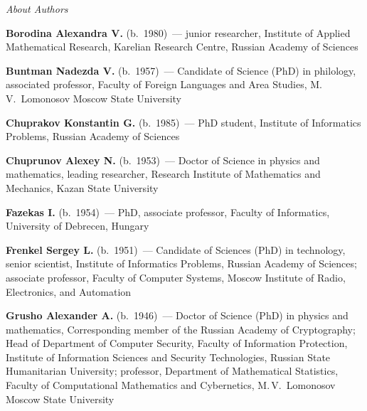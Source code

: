 \begin{center}\LARGE
\textit{About Authors}
\end{center}
\thispagestyle{empty}

\vspace*{48pt}

\begin{multicols}{2}



\noindent
\textbf{Borodina Alexandra V.} (b.\ 1980)~--- junior researcher,
Institute of Applied Mathematical Research, Karelian Research Centre, Russian Academy of Sciences

\vspace*{3pt}

\noindent
\textbf{Buntman Nadezda V.} (b.\ 1957)~--- Candidate of Science (PhD) in philology, 
associated professor, Faculty of Foreign Languages and Area Studies, M.\,V.~Lomonosov Moscow State University

\vspace*{3pt}

\noindent
\textbf{Chuprakov Konstantin G.} (b.\ 1985)~--- PhD student, Institute of Informatics Problems,  
Russian Academy of Sciences

\vspace*{3pt}

\noindent
\textbf{Chuprunov Alexey N.} (b.\ 1953)~--- Doctor of Science in physics and mathematics,
leading researcher, Research Institute of Mathematics and Mechanics, Kazan State University

\vspace*{3pt}

\noindent
\textbf{Fazekas I.} (b.\ 1954)~--- PhD, associate professor, Faculty of Informatics, University of Debrecen, Hungary

\vspace*{3pt}

\noindent
\textbf{Frenkel Sergey L.} (b.\ 1951)~--- Candidate of Sciences (PhD) in technology, senior scientist, 
Institute of Informatics Problems, Russian Academy of Sciences; associate professor, Faculty of Computer Systems, 
Moscow Institute of Radio, Electronics, and Automation

\vspace*{3pt}

\noindent
\textbf{Grusho Alexander A.} (b.\ 1946)~--- Doctor of Science (PhD) in physics and mathematics, 
Corresponding member of the Russian Academy of Cryptography; Head of Department of Computer Security, 
Faculty of Information Protection, Institute of Information Sciences and Security Technologies, 
Russian State Humanitarian University; professor, Department of Mathematical Statistics, 
Faculty of Computational Mathematics and Cybernetics, M.\,V.~Lomonosov Moscow State Univer\-sity


\end{multicols}

